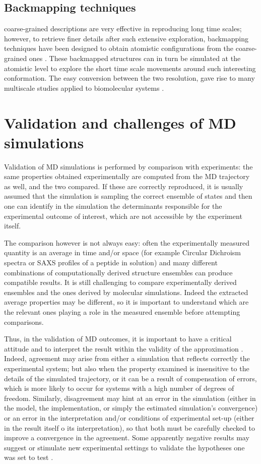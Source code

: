\subsection{Backmapping techniques} coarse-grained descriptions are very effective in reproducing long time scales; however, to retrieve finer details after such extensive exploration, backmapping techniques have been designed to obtain atomistic configurations from the coarse-grained ones \citep{Wassenaar2015}. These backmapped structures can in turn be simulated at the atomistic level to explore the short time scale movements around such interesting conformation. The easy conversion between the two resolution, gave rise to many multiscale studies applied to biomolecular systems \citep{Lee2012}.

\section{Validation and challenges of MD simulations}

Validation of MD simulations is performed by comparison with experiments: the same properties obtained experimentally are computed from the MD trajectory as well, and the two compared. If these are correctly reproduced, it is usually assumed that the simulation is sampling the correct ensemble of states and then one can identify in the simulation the determinants responsible for the experimental outcome of interest, which are not accessible by the experiment itself.

The comparison however is not always easy: often the experimentally measured quantity is an average in time and/or space (for example Circular Dichroism spectra or SAXS profiles of a peptide in solution) and many different combinations of computationally derived structure ensembles can produce compatible results. It is still challenging to compare experimentally derived ensembles and the ones derived by molecular simulations. Indeed the extracted average properties may be different, so it is important to understand which are the relevant ones playing a role in the measured ensemble before attempting comparisons.

Thus, in the validation of MD outcomes, it is important to have a critical attitude and to interpret the result within the validity of the approximation \citep{VanGunsteren2008}.
%
Indeed, agreement may arise from either a simulation that reflects correctly the experimental system; but also when the property examined is insensitive to the details of the simulated trajectory, or it can be a result of compensation of errors, which is more likely to  occur for systems with a high number of degrees of freedom.
%
Similarly, disagreement may hint at an error in the simulation (either in the model, the implementation, or simply the estimated simulation's convergence) or an error in the interpretation and/or conditions of experimental set-up (either in the result itself o its interpretation), so that both must be carefully checked to improve a convergence in the agreement.
%
Some apparently negative results may suggest or stimulate new experimental settings to validate the hypotheses one was set to test \citep{Goncalves2013,Meissner2014}.

